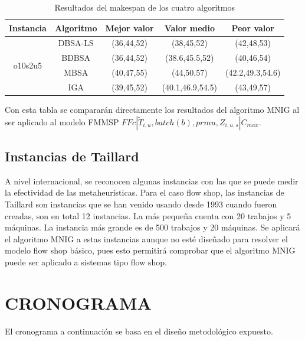\documentclass{article}
\def\notac_modelo{$FFc | \tilde{T}_{i, u}, batch(b), prmu, Z_{i, u, s} | C_{max}$}
\begin{document}
\begin{table}[h]
    \caption{Resultados del makespan de los cuatro algoritmos}
    \label{tab:algs}
    \begin{center}
    \begin{tabular}{ccccc}
        \hline
        Instancia & Algoritmo & Mejor valor & Valor medio & Peor valor\\
        \hline
        \multirow{4}{*}{o10s2u5} & DBSA-LS & (36,44,52) & (38,45,52) & (42,48,53)\\
         & BDBSA & (36,44,52) & (38.6,45.5,52) & (40,46,54)\\
         & MBSA & (40,47,55) & (44,50,57) & (42.2,49.3,54.6)\\
         & IGA & (39,45,52) & (40.1,46.9,54.5) & (43,49,57)\\
        \hline
    \end{tabular}
    \end{center}
\end{table}

Con esta tabla se compararán directamente los resultados del algoritmo MNIG al ser aplicado al modelo FMMSP \notac_modelo.

\subsection{Instancias de Taillard}

A nivel internacional, se reconocen algunas instancias con las que se puede medir la efectividad de las metaheurísticas. Para el caso flow shop, las instancias de Taillard son instancias que se han venido usando desde 1993 cuando fueron creadas, son en total 12 instancias. La más pequeña cuenta con 20 trabajos y 5 máquinas. La instancia más grande es de 500 trabajos y 20 máquinas. Se aplicará el algoritmo MNIG a estas instancias aunque no esté diseñado para resolver el modelo flow shop básico, pues esto permitirá comprobar que el algoritmo MNIG puede ser aplicado a sistemas tipo flow shop.

\section{CRONOGRAMA}

El cronograma a continuación se basa en el diseño metodológico expuesto.
\end{document}
